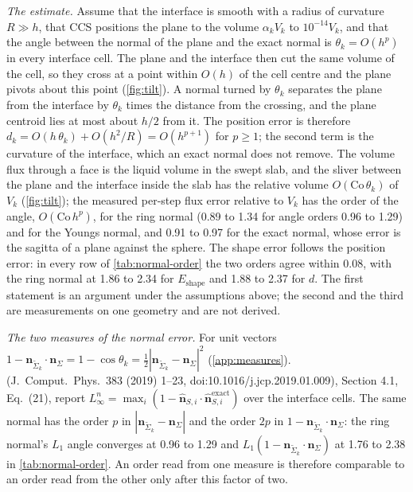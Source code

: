 \documentclass[preprint,12pt]{elsarticle}
\newcommand{\n}{\mathbf{n}}
\newcommand{\nSk}{\mathbf{n}_{\tilde{\Sigma}_k}}
\begin{document}
\emph{The estimate.} Assume that the interface is smooth with a radius of curvature $R \gg h$, that CCS positions the plane to the volume $\alpha_k V_k$ to $10^{-14} V_k$, and that the angle between the normal of the plane and the exact normal is $\theta_k = O(h^p)$ in every interface cell. The plane and the interface then cut the same volume of the cell, so they cross at a point within $O(h)$ of the cell centre and the plane pivots about this point (\cref{fig:tilt}). A normal turned by $\theta_k$ separates the plane from the interface by $\theta_k$ times the distance from the crossing, and the plane centroid lies at most about $h/2$ from it. The position error is therefore $d_k = O(h\,\theta_k) + O(h^2/R) = O(h^{p+1})$ for $p \ge 1$; the second term is the curvature of the interface, which an exact normal does not remove. The volume flux through a face is the liquid volume in the swept slab, and the sliver between the plane and the interface inside the slab has the relative volume $O(\mathrm{Co}\,\theta_k)$ of $V_k$ (\cref{fig:tilt}); the measured per-step flux error relative to $V_k$ has the order of the angle, $O(\mathrm{Co}\,h^p)$, for the ring normal (0.89 to 1.34 for angle orders 0.96 to 1.29) and for the Youngs normal, and 0.91 to 0.97 for the exact normal, whose error is the sagitta of a plane against the sphere. The shape error follows the position error: in every row of \cref{tab:normal-order} the two orders agree within 0.08, with the ring normal at 1.86 to 2.34 for $E_{\mathrm{shape}}$ and 1.88 to 2.37 for $d$. The first statement is an argument under the assumptions above; the second and the third are measurements on one geometry and are not derived.



\emph{The two measures of the normal error.} For unit vectors $1 - \nSk\cdot\n_\Sigma = 1 - \cos\theta_k = \tfrac12|\nSk - \n_\Sigma|^2$ (\ref{app:measures}). \citet{ScheuflerRoenby2019} (J.~Comput.~Phys.\ 383 (2019) 1--23, doi:10.1016/j.jcp.2019.01.009), Section 4.1, Eq.~(21), report $L_\infty^n = \max_i(1 - \hat{\mathbf{n}}_{S,i}\cdot\hat{\mathbf{n}}^{\mathrm{exact}}_{S,i})$ over the interface cells. The same normal has the order $p$ in $|\nSk - \n_\Sigma|$ and the order $2p$ in $1 - \nSk\cdot\n_\Sigma$: the ring normal's $L_1$ angle converges at 0.96 to 1.29 and $L_1(1 - \nSk\cdot\n_\Sigma)$ at 1.76 to 2.38 in \cref{tab:normal-order}. An order read from one measure is therefore comparable to an order read from the other only after this factor of two.
\end{document}

